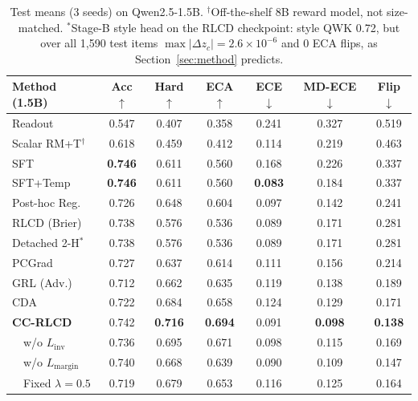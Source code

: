 \documentclass[letterpaper]{article} %
\begin{document}
\begin{table}[t]
\centering
\small
\setlength{\tabcolsep}{1.75pt}
\begin{tabular}{lcccccc}
\toprule
Method (1.5B) & Acc$\uparrow$ & Hard$\uparrow$ & ECA$\uparrow$ & ECE$\downarrow$ & MD-ECE$\downarrow$ & Flip$\downarrow$ \\
\midrule
Readout & 0.547 & 0.407 & 0.358 & 0.241 & 0.327 & 0.519 \\
Scalar RM+T$^\dagger$ & 0.618 & 0.459 & 0.412 & 0.114 & 0.219 & 0.463 \\
SFT & \textbf{0.746} & 0.611 & 0.560 & 0.168 & 0.226 & 0.337 \\
SFT+Temp & \textbf{0.746} & 0.611 & 0.560 & \textbf{0.083} & 0.184 & 0.337 \\
Post-hoc Reg. & 0.726 & 0.648 & 0.604 & 0.097 & 0.142 & 0.241 \\
RLCD (Brier) & 0.738 & 0.576 & 0.536 & 0.089 & 0.171 & 0.281 \\
Detached 2-H$^\ast$ & 0.738 & 0.576 & 0.536 & 0.089 & 0.171 & 0.281 \\
PCGrad & 0.727 & 0.637 & 0.614 & 0.111 & 0.156 & 0.214 \\
GRL (Adv.) & 0.712 & 0.662 & 0.635 & 0.119 & 0.138 & 0.189 \\
CDA & 0.722 & 0.684 & 0.658 & 0.124 & 0.129 & 0.171 \\
\midrule
\textbf{CC-RLCD} & 0.742 & \textbf{0.716} & \textbf{0.694} & 0.091 & \textbf{0.098} & \textbf{0.138} \\
\ \ w/o $L_{\mathrm{inv}}$ & 0.736 & 0.695 & 0.671 & 0.098 & 0.115 & 0.169 \\
\ \ w/o $L_{\mathrm{margin}}$ & 0.740 & 0.668 & 0.639 & 0.090 & 0.109 & 0.147 \\
\ \ Fixed $\lambda{=}0.5$ & 0.719 & 0.679 & 0.653 & 0.116 & 0.125 & 0.164 \\
\bottomrule
\end{tabular}
\caption{Test means (3 seeds) on Qwen2.5-1.5B. $^\dagger$Off-the-shelf 8B reward model, not size-matched. $^\ast$Stage-B style head on the RLCD checkpoint: style QWK 0.72, but over all 1,590 test items $\max|\Delta z_c|{=}2.6\times10^{-6}$ and 0 ECA flips, as Section~\ref{sec:method} predicts.}
\label{tab:main}
\end{table}
\end{document}
